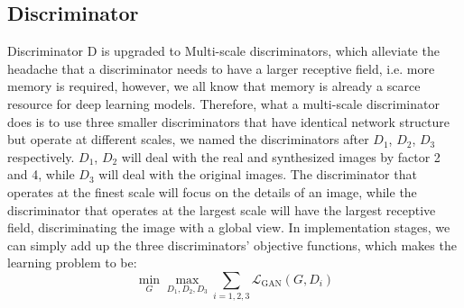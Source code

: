 \subsection{Discriminator}
Discriminator D is upgraded to Multi-scale discriminators, which alleviate the headache that a 
discriminator needs to have a larger receptive field, i.e. more memory is required, however, we 
all know that memory is already a scarce resource for deep learning models. Therefore, what a 
multi-scale discriminator does is to use three smaller discriminators that have identical network
structure but operate at different scales, we named the discriminators after $D_{1}$, $D_{2}$, $D_{3}$ 
respectively. $D_{1}$, $D_{2}$ will deal with the real and synthesized images by factor 2 and 4, 
while $D_{3}$ will deal with the original images. The discriminator that operates at the finest 
scale will focus on the details of an image, while the discriminator that operates at the largest 
scale will have the largest receptive field, discriminating the image with a global view. In 
implementation stages, we can simply add up the three discriminators' objective functions, which makes 
the learning problem to be:
$$\min _{G} \max _{D_{1}, D_{2}, D_{3}} \sum_{i=1,2,3} \mathcal{L}_{\mathrm{GAN}}\left(G, D_{i}\right)$$

